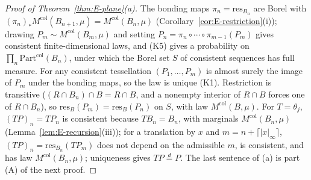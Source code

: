 \documentclass[11pt]{article}
\theoremstyle{plain}
\theoremstyle{definition}
\theoremstyle{remark}
\newcommand{\Part}{\mathrm{Part}}
\newcommand{\Mcol}{M^{\mathrm{col}}}
\newcommand{\resB}{\mathrm{res}}
\begin{document}
\begin{proof}[Proof of Theorem~\ref{thm:E-plane}(a)]
The bonding maps $\pi_n=\resB_{B_n}$ are Borel with
$(\pi_n)_*\Mcol(B_{n+1},\mu)=\Mcol(B_n,\mu)$ (Corollary~\ref{cor:E-restriction}(i)); drawing
$P_m\sim\Mcol(B_m,\mu)$ and setting $P_n=\pi_n\circ\cdots\circ\pi_{m-1}(P_m)$ gives consistent
finite-dimensional laws, and (K5) gives a probability on $\prod_n\Part^{\mathrm{col}}(B_n)$, under
which the Borel set $S$ of consistent sequences has full measure. For any
consistent tessellation $(P_1,\dots,P_m)$ is almost surely the image of $P_m$ under the
bonding maps, so the law is unique (K1). Restriction is transitive
($(R\cap B_n)\cap B=R\cap B$, and a nonempty interior of $R\cap B$ forces one of $R\cap B_n$), so
$\resB_B(P_m)=\resB_B(P_n)$ on $S$, with law $\Mcol(B,\mu)$. For $T=\theta_j$, $(TP)_n=TP_n$ is
consistent because $TB_n=B_n$, with marginals $\Mcol(B_n,\mu)$
(Lemma~\ref{lem:E-recursion}(iii)); for a translation by $x$ and
$m=n+\lceil|x|_\infty\rceil$, $(TP)_n=\resB_{B_n}(TP_m)$ does not depend on the admissible $m$, is
consistent, and has law $\Mcol(B_n,\mu)$; uniqueness gives $TP\overset{d}{=}P$. The last
sentence of (a) is part (A) of the next proof.
\end{proof}
\end{document}
